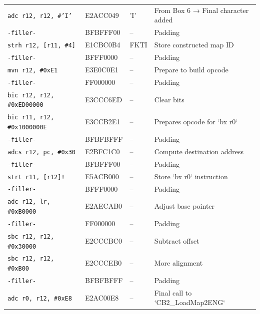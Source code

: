 \documentclass[a4paper]{usiinfbachelorproject}
\begin{document}
\begin{table}
\begin{tabular}{|l|l|l|p{6cm}|}
		\texttt{adc r12, r12, \#'I'}        & E2ACC049              & 'I'                     & From Box 6 → Final character added \\
		\texttt{-filler-}                   & BFBFFF00              & --                      & Padding                            \\
		\texttt{strh r12, [r11, \#4]}       & E1CBC0B4              & FKTI                    & Store constructed map ID           \\
		\texttt{-filler-}                   & BFFF0000              & --                      & Padding                            \\
		\texttt{mvn r12, \#0xE1}            & E3E0C0E1              & --                      & Prepare to build opcode            \\
		\texttt{-filler-}                   & FF000000              & --                      & Padding                            \\
		\texttt{bic r12, r12, \#0xED00000}  & E3CCC6ED              & --                      & Clear bits                         \\
		\texttt{bic r11, r12, \#0x1000000E} & E3CCB2E1              & --                      & Prepares opcode for `bx r0`        \\
		\texttt{-filler-}                   & BFBFBFFF              & --                      & Padding                            \\
		\texttt{adcs r12, pc, \#0x30}       & E2BFC1C0              & --                      & Compute destination address        \\
		\texttt{-filler-}                   & BFBFFF00              & --                      & Padding                            \\
		\texttt{strt r11, [r12]!}           & E5ACB000              & --                      & Store `bx r0` instruction          \\
		\texttt{-filler-}                   & BFFF0000              & --                      & Padding                            \\
		\texttt{adc r12, lr, \#0xB0000}     & E2AECAB0              & --                      & Adjust base pointer                \\
		\texttt{-filler-}                   & FF000000              & --                      & Padding                            \\
		\texttt{sbc r12, r12, \#0x30000}    & E2CCCBC0              & --                      & Subtract offset                    \\
		\texttt{sbc r12, r12, \#0xB00}      & E2CCCEB0              & --                      & More alignment                     \\
		\texttt{-filler-}                   & BFBFBFFF              & --                      & Padding                            \\
		\texttt{adc r0, r12, \#0xE8}        & E2AC00E8              & --                      & Final call to `CB2\_LoadMap2ENG`   \\
		\hline
	\end{tabular}


\end{table}
\end{document}
